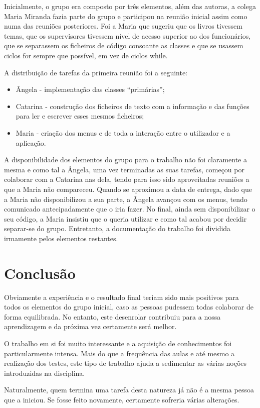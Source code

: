 \documentclass[12pt,a4paper,reqno]{report}
\numberwithin{figure}{section}
\numberwithin{equation}{section}
\begin{document}
Inicialmente, o grupo era composto por três elementos, além das autoras, a colega Maria Miranda fazia parte do grupo e participou na reunião inicial assim como numa das reuniões posteriores. Foi a Maria que sugeriu que os livros tivessem temas, que os supervisores tivessem nível de acesso superior ao dos funcionários, que se separassem os ficheiros de código consoante as classes e que se usassem ciclos for sempre que possível, em vez de ciclos while.

A distribuição de tarefas da primeira reunião foi a seguinte:
\begin{itemize}
	\item Ângela - implementação das classes ``primárias'';
	\item Catarina - construção dos ficheiros de texto com a informação e das funções para ler e escrever esses mesmos ficheiros;
	\item Maria - criação dos menus e de toda a interação entre o utilizador e a aplicação.
\end{itemize}

A disponibilidade dos elementos do grupo para o trabalho não foi claramente a mesma e como tal a Ângela, uma vez terminadas as suas tarefas, começou por colaborar com a Catarina nas dela, tendo para isso sido aproveitadas reuniões a que a Maria não compareceu. Quando se aproximou a data de entrega, dado que a Maria não disponibilizou a sua parte, a Ângela avançou com os menus, tendo comunicado antecipadamente que o iria fazer. No final, ainda sem disponibilizar o seu código, a Maria insistiu que o queria utilizar e como tal acabou por decidir separar-se do grupo. Entretanto, a documentação do trabalho foi dividida irmamente pelos elementos restantes.

\chapter{Conclusão}

Obviamente a experiência e o resultado final teriam sido mais positivos para todos os elementos do grupo inicial, caso as pessoas pudessem todas colaborar de forma equilibrada. No entanto, este desenrolar contribuiu para a nossa aprendizagem e da próxima vez certamente será melhor.

O trabalho em si foi muito interessante e a aquisição de conhecimentos foi particularmente intensa. Mais do que a frequência das aulas e até mesmo a realização dos testes, este tipo de trabalho ajuda a sedimentar as várias noções introduzidas na disciplina.

Naturalmente, quem termina uma tarefa desta natureza já não é a mesma pessoa que a iniciou. Se fosse feito novamente, certamente sofreria várias alterações.
\end{document}
